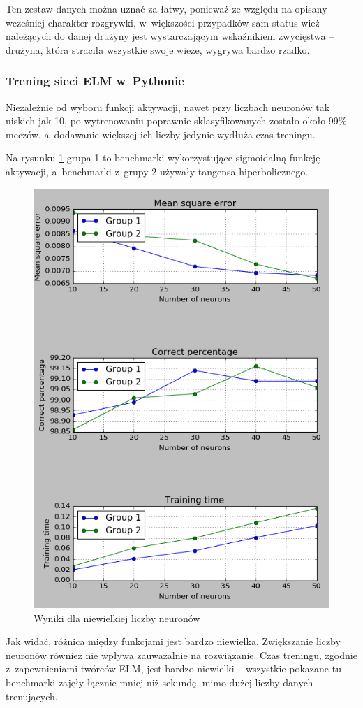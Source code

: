 \documentclass{article}
\begin{document}
Ten zestaw danych można uznać za łatwy, ponieważ ze względu na opisany wcześniej charakter rozgrywki, w~większości przypadków sam status wież należących do danej drużyny jest wystarczającym wskaźnikiem zwycięstwa -- drużyna, która straciła wszystkie swoje wieże, wygrywa bardzo rzadko.
\subsubsection{Trening sieci ELM w~Pythonie}
Niezależnie od wyboru funkcji aktywacji, nawet przy liczbach neuronów tak niskich jak 10, po wytrenowaniu poprawnie sklasyfikowanych zostało około 99\% meczów, a~dodawanie większej ich liczby jedynie wydłuża czas treningu. 

Na rysunku \ref{wyniki_dota2_python} grupa 1 to benchmarki wykorzystujące sigmoidalną funkcję aktywacji, a~benchmarki z~grupy 2 używały tangensa hiperbolicznego.

\begin{figure}[H]
\centering
\includegraphics[width=\textwidth]{wyniki_dota2_python.png}
\caption{Wyniki dla niewielkiej liczby neuronów}
\label{wyniki_dota2_python}
\end{figure}
Jak widać, różnica między funkcjami jest bardzo niewielka. Zwiększanie liczby neuronów również nie wpływa zauważalnie na rozwiązanie. Czas treningu, zgodnie z~zapewnieniami twórców ELM, jest bardzo niewielki -- wszystkie pokazane tu benchmarki zajęły łącznie mniej niż sekundę, mimo dużej liczby danych trenujących. 
\end{document}
